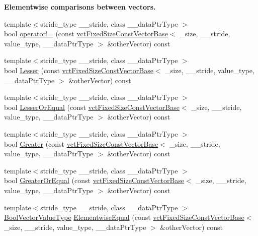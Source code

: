 \begin{Indent}{\bf Elementwise comparisons between vectors.}
\begin{DoxyCompactItemize}
\item 
{\footnotesize template$<$stride\+\_\+type \+\_\+\+\_\+stride, class \+\_\+\+\_\+data\+Ptr\+Type $>$ }\\bool \hyperlink{classvct_fixed_size_const_vector_base_a9cc58a2f86353b2c8d613ddf18442f0c}{operator!=} (const \hyperlink{classvct_fixed_size_const_vector_base}{vct\+Fixed\+Size\+Const\+Vector\+Base}$<$ \+\_\+size, \+\_\+\+\_\+stride, value\+\_\+type, \+\_\+\+\_\+data\+Ptr\+Type $>$ \&other\+Vector) const 
\item 
{\footnotesize template$<$stride\+\_\+type \+\_\+\+\_\+stride, class \+\_\+\+\_\+data\+Ptr\+Type $>$ }\\bool \hyperlink{classvct_fixed_size_const_vector_base_a6f1e9c515d2702d34579bf02ec9b20af}{Lesser} (const \hyperlink{classvct_fixed_size_const_vector_base}{vct\+Fixed\+Size\+Const\+Vector\+Base}$<$ \+\_\+size, \+\_\+\+\_\+stride, value\+\_\+type, \+\_\+\+\_\+data\+Ptr\+Type $>$ \&other\+Vector) const 
\item 
{\footnotesize template$<$stride\+\_\+type \+\_\+\+\_\+stride, class \+\_\+\+\_\+data\+Ptr\+Type $>$ }\\bool \hyperlink{classvct_fixed_size_const_vector_base_a4b261299156a998aaacaad3965cad247}{Lesser\+Or\+Equal} (const \hyperlink{classvct_fixed_size_const_vector_base}{vct\+Fixed\+Size\+Const\+Vector\+Base}$<$ \+\_\+size, \+\_\+\+\_\+stride, value\+\_\+type, \+\_\+\+\_\+data\+Ptr\+Type $>$ \&other\+Vector) const 
\item 
{\footnotesize template$<$stride\+\_\+type \+\_\+\+\_\+stride, class \+\_\+\+\_\+data\+Ptr\+Type $>$ }\\bool \hyperlink{classvct_fixed_size_const_vector_base_a96afecfdcad63e7c4726061da0b0be35}{Greater} (const \hyperlink{classvct_fixed_size_const_vector_base}{vct\+Fixed\+Size\+Const\+Vector\+Base}$<$ \+\_\+size, \+\_\+\+\_\+stride, value\+\_\+type, \+\_\+\+\_\+data\+Ptr\+Type $>$ \&other\+Vector) const 
\item 
{\footnotesize template$<$stride\+\_\+type \+\_\+\+\_\+stride, class \+\_\+\+\_\+data\+Ptr\+Type $>$ }\\bool \hyperlink{classvct_fixed_size_const_vector_base_a51d3b98adfbe986f056857c7fa5beada}{Greater\+Or\+Equal} (const \hyperlink{classvct_fixed_size_const_vector_base}{vct\+Fixed\+Size\+Const\+Vector\+Base}$<$ \+\_\+size, \+\_\+\+\_\+stride, value\+\_\+type, \+\_\+\+\_\+data\+Ptr\+Type $>$ \&other\+Vector) const 
\item 
{\footnotesize template$<$stride\+\_\+type \+\_\+\+\_\+stride, class \+\_\+\+\_\+data\+Ptr\+Type $>$ }\\\hyperlink{classvct_fixed_size_const_vector_base_a15899465a75a2f78965bdcf2d6e34bc5}{Bool\+Vector\+Value\+Type} \hyperlink{classvct_fixed_size_const_vector_base_a5b1ef9c19b953cba03dfa4679fa891de}{Elementwise\+Equal} (const \hyperlink{classvct_fixed_size_const_vector_base}{vct\+Fixed\+Size\+Const\+Vector\+Base}$<$ \+\_\+size, \+\_\+\+\_\+stride, value\+\_\+type, \+\_\+\+\_\+data\+Ptr\+Type $>$ \&other\+Vector) const 

\end{DoxyCompactItemize}
\end{Indent}
